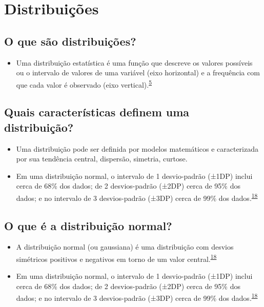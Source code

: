\documentclass[
]{book}
\providecommand{\tightlist}{%
  \setlength{\itemsep}{0pt}\setlength{\parskip}{0pt}}
\begin{document}
\hypertarget{distribuicoes}{%
\section{Distribuições}\label{distribuicoes}}

\hypertarget{o-que-suxe3o-distribuiuxe7uxf5es}{%
\subsection{O que são distribuições?}\label{o-que-suxe3o-distribuiuxe7uxf5es}}

\begin{itemize}
\tightlist
\item
  Uma distribuição estatística é uma função que descreve os valores possíveis ou o intervalo de valores de uma variável (eixo horizontal) e a frequência com que cada valor é observado (eixo vertical).\textsuperscript{\protect\hyperlink{ref-vetter2017}{5}}
\end{itemize}

\hypertarget{quais-caracteruxedsticas-definem-uma-distribuiuxe7uxe3o}{%
\subsection{Quais características definem uma distribuição?}\label{quais-caracteruxedsticas-definem-uma-distribuiuxe7uxe3o}}

\begin{itemize}
\item
  Uma distribuição pode ser definida por modelos matemáticos e caracterizada por sua tendência central, dispersão, simetria, curtose.
\item
  Em uma distribuição normal, o intervalo de 1 desvio-padrão (±1DP) inclui cerca de 68\% dos dados; de 2 desvios-padrão (±2DP) cerca de 95\% dos dados; e no intervalo de 3 desvios-padrão (±3DP) cerca de 99\% dos dados.\textsuperscript{\protect\hyperlink{ref-Ali2016}{18}}
\end{itemize}

\hypertarget{o-que-uxe9-a-distribuiuxe7uxe3o-normal}{%
\subsection{O que é a distribuição normal?}\label{o-que-uxe9-a-distribuiuxe7uxe3o-normal}}

\begin{itemize}
\item
  A distribuição normal (ou gaussiana) é uma distribuição com desvios simétricos positivos e negativos em torno de um valor central.\textsuperscript{\protect\hyperlink{ref-Ali2016}{18}}
\item
  Em uma distribuição normal, o intervalo de 1 desvio-padrão (±1DP) inclui cerca de 68\% dos dados; de 2 desvios-padrão (±2DP) cerca de 95\% dos dados; e no intervalo de 3 desvios-padrão (±3DP) cerca de 99\% dos dados.\textsuperscript{\protect\hyperlink{ref-Ali2016}{18}}
\end{itemize}
\end{document}
